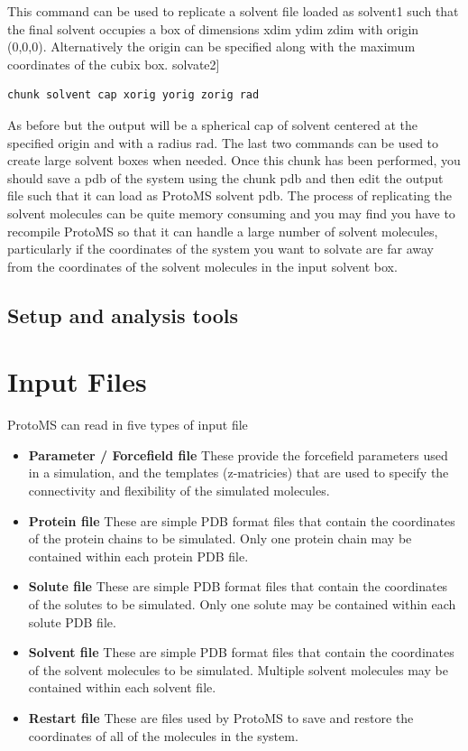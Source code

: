 \documentclass[letterpaper,10pt,english]{sphinxmanual}
\begin{document}
This command can be used to replicate a solvent file loaded as solvent1 such that the final solvent occupies a box of dimensions xdim ydim zdim with origin (0,0,0). Alternatively the origin can be specified along with the maximum coordinates of the cubix box. solvate2{]}

\begin{Verbatim}[commandchars=\\\{\}]
chunk solvent cap xorig yorig zorig rad
\end{Verbatim}

As before but the output will be a spherical cap of solvent centered at the specified origin and with a radius rad. The last two commands can be used to create large solvent boxes when needed. Once this chunk has been performed, you should save a pdb of the system using the chunk pdb and then edit the output file such that it can load as ProtoMS solvent pdb. The process of replicating the solvent molecules can be quite memory consuming and you may find you have to recompile ProtoMS so that it can handle a large number of solvent molecules, particularly if the coordinates of the system you want to solvate are far away from the coordinates of the solvent molecules in the input solvent box.


\section{Setup and analysis tools}
\label{protoms:setup-and-analysis-tools}

\chapter{Input Files}
\label{protoms:input-files}
ProtoMS can read in five types of input file
\begin{itemize}
\item {} 
\textbf{Parameter / Forcefield file} These provide the forcefield parameters used in a simulation, and the templates (z-matricies) that are used to specify the connectivity and flexibility of the simulated molecules.

\item {} 
\textbf{Protein file} These are simple PDB format files that contain the coordinates of the protein chains to be simulated. Only one protein chain may be contained within each protein PDB file.

\item {} 
\textbf{Solute file} These are simple PDB format files that contain the coordinates of the solutes to be simulated. Only one solute may be contained within each solute PDB file.

\item {} 
\textbf{Solvent file} These are simple PDB format files that contain the coordinates of the solvent molecules to be simulated. Multiple solvent molecules may be contained within each solvent file.

\item {} 
\textbf{Restart file} These are files used by ProtoMS to save and restore the coordinates of all of the molecules in the system.

\end{itemize}
\end{document}
